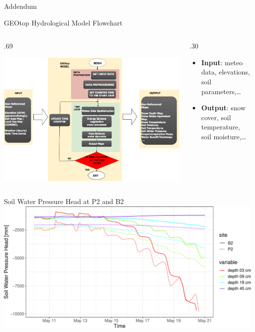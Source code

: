 \documentclass[
  ignorenonframetext,
]{beamer}
\def\begincols{\begin{columns}}
\def\begincol{\begin{column}}
\def\endcol{\end{column}}
\def\endcols{\end{columns}}
\begin{document}
\begin{frame}{Addendum}
\protect\hypertarget{addendum}{}
\end{frame}

\begin{frame}{GEOtop Hydrological Model Flowchart}
\protect\hypertarget{geotop-hydrological-model-flowchart}{}
\begincols

\begincol{.69\textwidth}

\includegraphics[width=1\textwidth,height=\textheight]{resources/images/geotop_revised.png}\\
\endcol

\begincol{.30\textwidth}

\begin{itemize}
\item
  \textbf{Input}: meteo data, elevations, soil parameters,\ldots{}
\item
  \textbf{Output}: snow cover, soil temperature, soil moisture,\ldots{}
\end{itemize}

\endcol
\endcols
\end{frame}

\begin{frame}{Soil Water Pressure Head at P2 and B2}
\protect\hypertarget{soil-water-pressure-head-at-p2-and-b2}{}
\includegraphics{presentation_files/figure-beamer/unnamed-chunk-14-1.pdf}
\end{frame}
\end{document}
